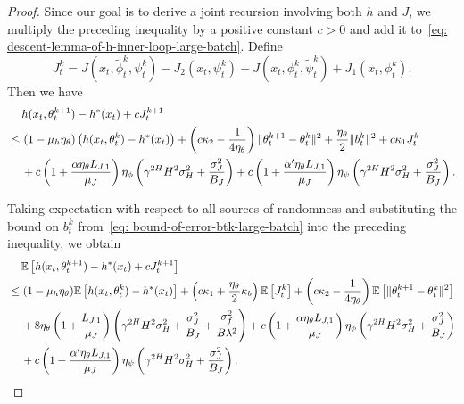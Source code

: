 \documentclass{article}
\theoremstyle{plain}
\theoremstyle{definition}
\theoremstyle{remark}
\def\E{\mathbb E}
\begin{document}
\begin{proof}
Since our goal is to derive a joint recursion involving both $h$ and $J$,
we multiply the preceding inequality by a positive constant $c>0$ and add it
to~\eqref{eq: descent-lemma-of-h-inner-loop-large-batch}. Define
\[
J_t^k
=
J(x_t,\tilde{\phi}_t^{k},\psi_t^{k})
-
J_2(x_t,\psi_t^{k})
-
J(x_t,\phi_t^{k},\tilde{\psi}_t^{k})
+
J_1(x_t,\phi_t^{k}).
\]
Then we have
\begin{align}
        & \quad \, h(x_t,\theta_t^{k+1}) - h^*(x_t) + c J_t^{k+1} \notag \\
        & \leq (1 - \mu_h \eta_\theta) \left(h(x_t,\theta_t^{k}) - h^*(x_t)\right) + \left(c \kappa_2 - \frac{1}{4\eta_\theta} \right) \|\theta_t^{k+1} - \theta_t^k \|^2 + \frac{\eta_\theta}{2} \| b_t^k\|^2 + c \kappa_1 J_t^k\notag \\
        & \quad \, + c \left( 1 +\frac{\alpha \eta_\theta L_{J,1}}{\mu_J} \right) \eta_\phi \left( \gamma^{2H} H^2 \sigma_H^2 + \frac{\sigma_J^2}{B_{J}} \right) + c\left( 1 +\frac{\alpha' \eta_\theta L_{J,1}}{\mu_J} \right)  \eta_\psi \left( \gamma^{2H} H^2 \sigma_H^2 + \frac{\sigma_J^2}{B_{J}} \right).
    \end{align}
    
Taking expectation with respect to all sources of randomness and substituting
the bound on $b_t^k$ from~\eqref{eq: bound-of-error-btk-large-batch} into the
preceding inequality, we obtain
\begin{align}
        & \quad\, \E \left[ h(x_t,\theta_t^{k+1}) - h^*(x_t) + c J_t^{k+1}\right] \notag \\
        & \leq (1 - \mu_h \eta_\theta) \E \left[h(x_t,\theta_t^{k}) - h^*(x_t)\right] + \left( c \kappa_1 + \frac{\eta_\theta}{2}\kappa_b  \right)\E \left[ J_t^k \right] + \left( c \kappa_2 - \frac{1}{4\eta_\theta} \right) \E \left[\|\theta_t^{k+1} - \theta_t^k \|^2\right] \notag \\
        & \quad \, +8 \eta_\theta\left( 1 + \frac{L_{J,1}}{\mu_J}\right) \left( \gamma^{2H} H^2 \sigma_H^2 + \frac{\sigma_J^2}{B_J} +  \frac{\sigma_f^2}{B \lambda^2}\right)  + c \left( 1 +\frac{\alpha \eta_\theta L_{J,1}}{\mu_J} \right) \eta_\phi \left( \gamma^{2H} H^2\sigma_H^2 + \frac{\sigma_J^2}{B_{J}} \right) \notag \\
        & \quad \, + c \left( 1 +\frac{\alpha' \eta_\theta L_{J,1}}{\mu_J} \right) \eta_\psi \left( \gamma^{2H}H^2 \sigma_H^2 + \frac{\sigma_J^2}{B_{J}} \right) .
    \end{align}


\end{proof}
\end{document}
